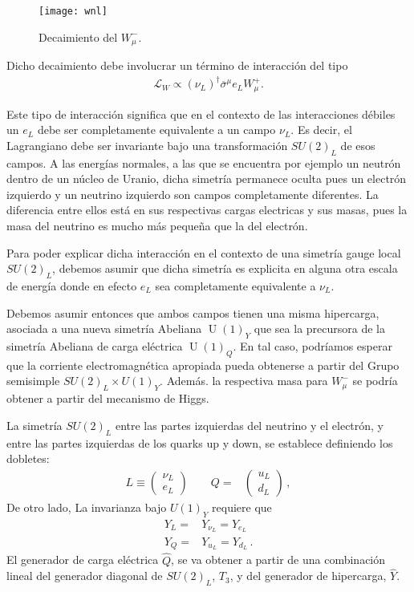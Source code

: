 \begin{figure}
  \centering
  \texttt{[image: wnl]}
  \caption{Decaimiento del $W_\mu^-$.}
  \label{fig:wnl}
\end{figure}

Dicho decaimiento debe involucrar un término de interacción del tipo
\begin{align}
  \mathcal{L}_{W}\propto \left( \nu_L \right)^{\dagger}\overline{\sigma}^{\mu} e_L W_{\mu}^{+}.
\end{align}


\begin{frame}
Este tipo de interacción significa que en el contexto de las interacciones débiles un $e_L$ debe ser completamente
equivalente a un campo $\nu_L$. Es decir, el Lagrangiano debe ser
invariante bajo una transformación $SU(2)_L$ de esos campos. A las energías normales, a las que se encuentra por ejemplo un neutrón dentro de un núcleo de Uranio, dicha simetría permanece oculta pues un electrón izquierdo y un neutrino izquierdo son campos completamente diferentes.
La
diferencia entre ellos está en sus respectivas cargas electricas y sus
masas, pues la masa del neutrino es mucho más pequeña que la del electrón. 

Para poder explicar dicha interacción en el contexto de una simetría gauge local $SU(2)_L$, debemos asumir que dicha simetría es explicita en alguna otra escala de energía donde en efecto  $e_L$ sea completamente
equivalente a $\nu_L$.

Debemos asumir entonces que ambos campos tienen una misma hipercarga,
asociada a una nueva simetría Abeliana $\operatorname{U}(1)_Y$ que sea la precursora de la simetría Abeliana de carga eléctrica $\operatorname{U}(1)_Q$. En tal caso, podríamos esperar que
la corriente electromagnética apropiada pueda obtenerse a partir del
Grupo semisimple $SU(2)_L\times U(1)_Y$. Además. la respectiva masa para $W_{\mu}^{-}$
se podría obtener a partir del mecanismo de Higgs.

La simetría $SU(2)_L$ entre las partes izquierdas del neutrino y el electrón, y entre las partes izquierdas de los quarks up y down, se establece  definiendo los dobletes:
  \begin{align}
    L\equiv\begin{pmatrix}
      \nu_L\\
      e_L      
    \end{pmatrix}\qquad   Q=&\begin{pmatrix}
    u_L\\
    d_L
  \end{pmatrix}\,,
  \end{align}
De otro lado, La invarianza bajo $U(1)_Y$ requiere que
\begin{align}
  Y_L=&Y_{\nu_L}=Y_{e_L}\nonumber\\
  Y_Q=&Y_{u_L}=Y_{d_L}\,.
\end{align}
El generador de carga eléctrica $\widehat{Q}$, se va obtener a partir de una combinación lineal del generador diagonal de $SU(2)_L$, $T_3$, y del generador de hipercarga, $\widehat{Y}$.


\end{frame}
